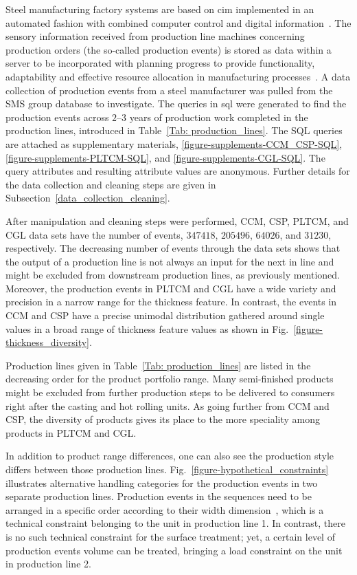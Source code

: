 Steel manufacturing factory systems are based on \ac{cim} implemented in an automated fashion with combined computer control and digital information~\cite{waldner1992}. The sensory information received from production line machines concerning production orders (the so-called production events) is stored as data within a server to be incorporated with planning progress to provide functionality, adaptability and effective resource allocation in manufacturing processes~\cite{Saadaoui2019}. A data collection of production events from a steel manufacturer was pulled from the SMS group database to investigate. The queries in \ac{sql} were generated to find the production events across $2$--$3$ years of production work completed in the production lines, introduced in Table~\ref{Tab: production_lines}. The SQL queries are attached as supplementary materials, \ref{figure-supplements-CCM_CSP-SQL}, \ref{figure-supplements-PLTCM-SQL}, and \ref{figure-supplements-CGL-SQL}. The query attributes and resulting attribute values are anonymous. Further details for the data collection and cleaning steps are given in Subsection~\ref{data_collection_cleaning}.

After manipulation and cleaning steps were performed, CCM, CSP, PLTCM, and CGL data sets have the number of events, $347418$, $205496$, $64026$, and $31230$, respectively. The decreasing number of events through the data sets shows that the output of a production line is not always an input for the next in line and might be excluded from downstream production lines, as previously mentioned. Moreover, the production events in PLTCM and CGL have a wide variety and precision in a narrow range for the thickness feature. In contrast, the events in CCM and CSP have a precise unimodal distribution gathered around single values in a broad range of thickness feature values as shown in Fig.~\ref{figure-thickness_diversity}.



Production lines given in Table~\ref{Tab: production_lines} are listed in the decreasing order for the product portfolio range. Many semi-finished products might be excluded from further production steps to be delivered to consumers right after the casting and hot rolling units. As going further from CCM and CSP, the diversity of products gives its place to the more speciality among products in PLTCM and CGL.



In addition to product range differences, one can also see the production style differs between those production lines. Fig.~\ref{figure-hypothetical_constraints} illustrates alternative handling categories for the production events in two separate production lines. Production events in the sequences need to be arranged in a specific order according to their width dimension~\cite{OZGUR2021106606}, which is a technical constraint belonging to the unit in production line 1. In contrast, there is no such technical constraint for the surface treatment; yet, a certain level of production events volume can be treated, bringing a load constraint on the unit in production line 2.


